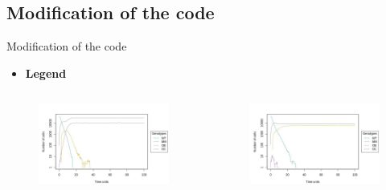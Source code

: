 \subsection{Modification of the code}
\begin{frame}{Modification of the code}
\begin{itemize}
        \item \textbf{Legend}
\end{itemize}
\begin{columns}
        \begin{column}{0.5\textwidth}
            \begin{figure}[t]
                \includegraphics[width=0.9\linewidth]{img/scenario1_tr.jpg}
            \end{figure}
        \end{column}
        \begin{column}{0.5\textwidth}
            \begin{figure}[t]
                \includegraphics[width=0.9\linewidth]{img/scenario2_tr.jpg}
            \end{figure}
        \end{column}
    \end{columns}
\end{frame}